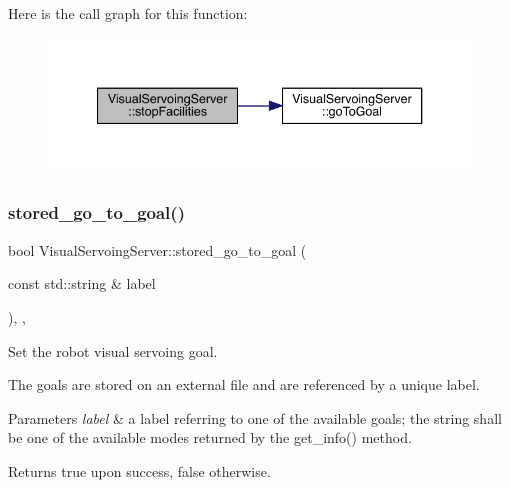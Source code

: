 Here is the call graph for this function\+:
\nopagebreak
\begin{figure}[H]
\begin{center}
\leavevmode
\includegraphics[width=340pt]{classVisualServoingServer_a0cd7a77750df9c1faaf1a18be6305de9_cgraph}
\end{center}
\end{figure}
\mbox{\label{classVisualServoingServer_a1c5018056e6a7db492cc6b1418f8d1e5}} 
\subsubsection{\texorpdfstring{stored\+\_\+go\+\_\+to\+\_\+goal()}{stored\_go\_to\_goal()}}
{\footnotesize\ttfamily bool Visual\+Servoing\+Server\+::stored\+\_\+go\+\_\+to\+\_\+goal (\begin{DoxyParamCaption}\item[{const std\+::string \&}]{label }\end{DoxyParamCaption})\hspace{0.3cm}{\ttfamily [override]}, {\ttfamily [protected]}, {\ttfamily [virtual]}}



Set the robot visual servoing goal. 

The goals are stored on an external file and are referenced by a unique label. 
\begin{DoxyParams}{Parameters}
{\em label} & a label referring to one of the available goals; the string shall be one of the available modes returned by the get\+\_\+info() method. \\
\hline
\end{DoxyParams}
\begin{DoxyReturn}{Returns}
true upon success, false otherwise. 
\end{DoxyReturn}


